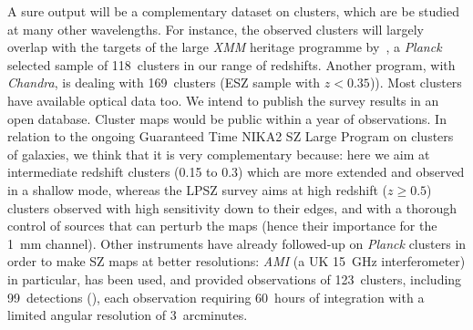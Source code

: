 \documentclass[10pt,a4paper,twoside,graphicx,color]{article}
\begin{document}
A sure output will be a complementary dataset on clusters, which are
be studied at many other wavelengths.  For instance, the observed
clusters will largely overlap with the targets of the large {\sl XMM}
heritage programme by~\cite{ChexMate2020}, a {\sl Planck} selected
sample of 118~clusters in our range of redshifts. Another program,
with {\sl Chandra}, is dealing with 169~clusters (ESZ sample with
$z<0.35$)). Most clusters have available optical data too. We intend to publish
the survey results in an open database. Cluster maps would be public
within a year of observations. In relation to the ongoing Guaranteed
Time NIKA2 SZ Large Program on clusters of galaxies, we think that it
is very complementary because: here we aim at intermediate redshift
clusters (0.15 to 0.3) which are more extended and observed in a
shallow mode, whereas the LPSZ survey aims at high redshift ($z\ge
0.5$) clusters observed with high sensitivity down to their edges, and
with a thorough control of sources that can perturb the maps (hence
their importance for the 1~mm channel). Other instruments have already
followed-up on {\sl Planck} clusters in order to make SZ maps at
better resolutions: {\sl AMI} (a UK 15~GHz interferometer) in
particular, has been used, and provided observations of 123~clusters,
including 99~detections (\cite{Perrott2015}), each observation
requiring 60~hours of integration with a limited angular resolution of
3~arcminutes.\\
\end{document}

